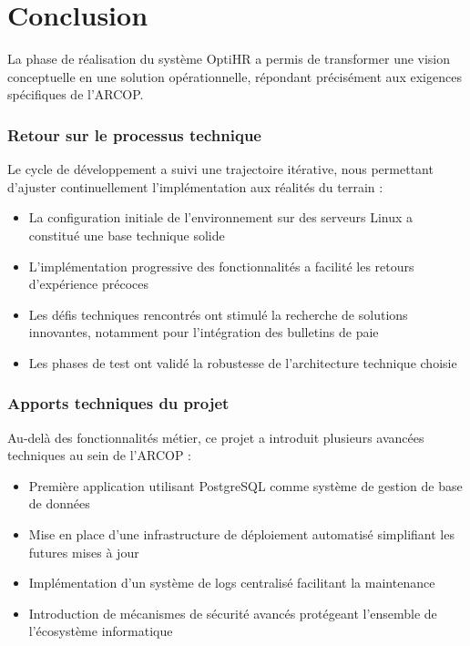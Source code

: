 \section{Conclusion}

La phase de réalisation du système OptiHR a permis de transformer une vision conceptuelle en une solution opérationnelle, répondant précisément aux exigences spécifiques de l'ARCOP.

\subsubsection{Retour sur le processus technique}

Le cycle de développement a suivi une trajectoire itérative, nous permettant d'ajuster continuellement l'implémentation aux réalités du terrain :

\begin{itemize}
    \item La configuration initiale de l'environnement sur des serveurs Linux a constitué une base technique solide
    \item L'implémentation progressive des fonctionnalités a facilité les retours d'expérience précoces
    \item Les défis techniques rencontrés ont stimulé la recherche de solutions innovantes, notamment pour l'intégration des bulletins de paie
    \item Les phases de test ont validé la robustesse de l'architecture technique choisie
\end{itemize}

\subsubsection{Apports techniques du projet}

Au-delà des fonctionnalités métier, ce projet a introduit plusieurs avancées techniques au sein de l'ARCOP :

\begin{itemize}
    \item Première application utilisant PostgreSQL comme système de gestion de base de données
    \item Mise en place d'une infrastructure de déploiement automatisé simplifiant les futures mises à jour
    \item Implémentation d'un système de logs centralisé facilitant la maintenance
    \item Introduction de mécanismes de sécurité avancés protégeant l'ensemble de l'écosystème informatique
\end{itemize}

